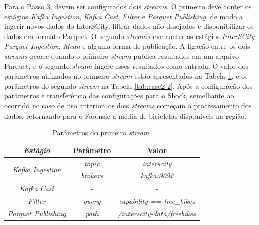 Para o Passo 3, devem ser configurados dois \textit{streams}. O primeiro deve
conter os estágios \textit{Kafka Ingestion}, \textit{Kafka Cast},
\textit{Filter} e \textit{Parquet Publishing}, de modo a ingerir novos dados
do InterSCity, filtrar dados não desejados e disponibilizar os dados em formato
Parquet. O segundo \textit{stream} deve conter os estágios
\textit{InterSCity Parquet Ingestion}, \textit{Mean} e alguma forma de
publicação. A ligação entre os dois \textit{streams} ocorre quando o primeiro
\textit{stream} publica resultados em um arquivo Parquet, e o segundo
\textit{stream} ingere esses resultados como entrada. O valor dos parâmetros
utilizados no primeiro \textit{stream} estão apresentados na Tabela
\ref{tab:case2-1}, e os parâmetros do segundo \textit{stream} na Tabela
\ref{tab:case2-2}. Após a configuração dos parâmetros e transferência das
configurações para o Shock, semelhante ao ocorrido no caso de uso anterior,
os dois \textit{streams} começam o processamento dos dados, retornando para o
Forensic a média de bicicletas disponíveis na região.

\begin{table}[]
    \centering
    \caption{Parâmetros do primeiro \textit{stream}.}
    \label{tab:case2-1}
    \begin{tabular}{|c|c|c|}
        \hline
        \textit{\textbf{Estágio}}                   & \textbf{Parâmetro} & \textbf{Valor}                      \\ \hline
        \multirow{2}{*}{\textit{Kafka Ingestion}} & \textit{topic}     & \textit{interscity}                 \\ \cline{2-3} 
                                                  & \textit{brokers}   & \textit{kafka:9092}                 \\ \hline
                                                  \textit{Kafka Cast}                       & -                  & -                                   \\ \hline
                                                  \textit{Filter}                           & \textit{query}     & \textit{capability == free\_bikes}  \\ \hline
                                                  \textit{Parquet Publishing}               & \textit{path}      & \textit{/interscity-data/freebikes} \\ \hline
    \end{tabular}
\end{table}

